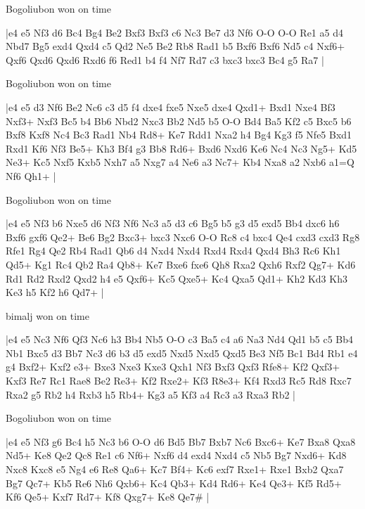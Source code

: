 \showboard

Bogoliubon won on time

\makegametitle
|e4 e5 Nf3 d6 Bc4 Bg4 Be2 Bxf3 Bxf3 c6 Nc3 Be7 d3 Nf6 O-O O-O Re1 a5 d4 Nbd7 Bg5 exd4 Qxd4 c5 Qd2 Ne5 Be2 Rb8 Rad1 b5 Bxf6 Bxf6 Nd5 c4 Nxf6+ Qxf6 Qxd6 Qxd6 Rxd6 f6 Red1 b4 f4 Nf7 Rd7 c3 bxc3 bxc3 Bc4 g5 Ra7  |

\showboard

Bogoliubon won on time

\makegametitle
|e4 e5 d3 Nf6 Be2 Nc6 c3 d5 f4 dxe4 fxe5 Nxe5 dxe4 Qxd1+ Bxd1 Nxe4 Bf3 Nxf3+ Nxf3 Bc5 b4 Bb6 Nbd2 Nxc3 Bb2 Nd5 b5 O-O Bd4 Ba5 Kf2 c5 Bxc5 b6 Bxf8 Kxf8 Nc4 Bc3 Rad1 Nb4 Rd8+ Ke7 Rdd1 Nxa2 h4 Bg4 Kg3 f5 Nfe5 Bxd1 Rxd1 Kf6 Nf3 Be5+ Kh3 Bf4 g3 Bb8 Rd6+ Bxd6 Nxd6 Ke6 Nc4 Nc3 Ng5+ Kd5 Ne3+ Kc5 Nxf5 Kxb5 Nxh7 a5 Nxg7 a4 Ne6 a3 Nc7+ Kb4 Nxa8 a2 Nxb6 a1=Q Nf6 Qh1+  |

\showboard

Bogoliubon won on time

\makegametitle
|e4 e5 Nf3 b6 Nxe5 d6 Nf3 Nf6 Nc3 a5 d3 c6 Bg5 b5 g3 d5 exd5 Bb4 dxc6 h6 Bxf6 gxf6 Qe2+ Be6 Bg2 Bxc3+ bxc3 Nxc6 O-O Rc8 c4 bxc4 Qe4 cxd3 cxd3 Rg8 Rfe1 Rg4 Qe2 Rb4 Rad1 Qb6 d4 Nxd4 Nxd4 Rxd4 Rxd4 Qxd4 Bh3 Rc6 Kh1 Qd5+ Kg1 Rc4 Qb2 Ra4 Qb8+ Ke7 Bxe6 fxe6 Qh8 Rxa2 Qxh6 Rxf2 Qg7+ Kd6 Rd1 Rd2 Rxd2 Qxd2 h4 e5 Qxf6+ Kc5 Qxe5+ Kc4 Qxa5 Qd1+ Kh2 Kd3 Kh3 Ke3 h5 Kf2 h6 Qd7+  |

\showboard

bimalj won on time

\makegametitle
|e4 e5 Nc3 Nf6 Qf3 Nc6 h3 Bb4 Nb5 O-O c3 Ba5 c4 a6 Na3 Nd4 Qd1 b5 c5 Bb4 Nb1 Bxc5 d3 Bb7 Nc3 d6 b3 d5 exd5 Nxd5 Nxd5 Qxd5 Be3 Nf5 Bc1 Bd4 Rb1 e4 g4 Bxf2+ Kxf2 e3+ Bxe3 Nxe3 Kxe3 Qxh1 Nf3 Bxf3 Qxf3 Rfe8+ Kf2 Qxf3+ Kxf3 Re7 Rc1 Rae8 Be2 Re3+ Kf2 Rxe2+ Kf3 R8e3+ Kf4 Rxd3 Rc5 Rd8 Rxc7 Rxa2 g5 Rb2 h4 Rxb3 h5 Rb4+ Kg3 a5 Kf3 a4 Rc3 a3 Rxa3 Rb2  |

\showboard

Bogoliubon won on time

\makegametitle
|e4 e5 Nf3 g6 Bc4 h5 Nc3 b6 O-O d6 Bd5 Bb7 Bxb7 Nc6 Bxc6+ Ke7 Bxa8 Qxa8 Nd5+ Ke8 Qe2 Qc8 Re1 c6 Nf6+ Nxf6 d4 exd4 Nxd4 c5 Nb5 Bg7 Nxd6+ Kd8 Nxc8 Kxc8 e5 Ng4 e6 Re8 Qa6+ Kc7 Bf4+ Kc6 exf7 Rxe1+ Rxe1 Bxb2 Qxa7 Bg7 Qc7+ Kb5 Re6 Nh6 Qxb6+ Kc4 Qb3+ Kd4 Rd6+ Ke4 Qe3+ Kf5 Rd5+ Kf6 Qe5+ Kxf7 Rd7+ Kf8 Qxg7+ Ke8 Qe7\#  |

